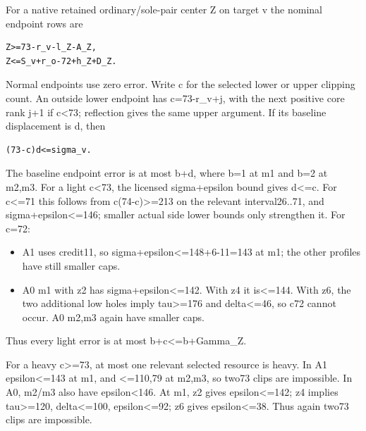 \documentclass[10pt,a4paper]{article}
\theoremstyle{definition}
\providecommand{\tightlist}{\setlength{\itemsep}{0pt}\setlength{\parskip}{0pt}}
\begin{document}
For a native retained ordinary/sole-pair center Z on target v the
nominal endpoint rows are

\begin{lstlisting}
Z>=73-r_v-l_Z-A_Z,
Z<=S_v+r_o-72+h_Z+D_Z.
\end{lstlisting}

Normal endpoints use zero error. Write c for the selected lower or upper
clipping count. An outside lower endpoint has c=\allowbreak{}73-r\_\allowbreak{}v+\allowbreak{}j,\allowbreak{} with the next
positive core rank j+\allowbreak{}1 if c\textless73; reflection gives the same upper
argument. If its baseline displacement is d,\allowbreak{} then

\begin{lstlisting}
(73-c)d<=sigma_v.
\end{lstlisting}

The baseline endpoint error is at most b+\allowbreak{}d,\allowbreak{} where b=\allowbreak{}1 at m1 and b=\allowbreak{}2 at
m2,\allowbreak{}m3. For a light c\textless73,\allowbreak{} the licensed sigma+\allowbreak{}epsilon bound gives
d\textless=\allowbreak{}c. For c\textless=\allowbreak{}71 this follows from
c(74-c)\textgreater=\allowbreak{}213 on the relevant interval26..71,\allowbreak{} and
sigma+\allowbreak{}epsilon\textless=\allowbreak{}146; smaller actual side lower bounds only
strengthen it. For c=\allowbreak{}72:

\begin{itemize}
\tightlist
\item
  A1 uses credit11,\allowbreak{} so sigma+\allowbreak{}epsilon\textless=\allowbreak{}148+\allowbreak{}6-11=\allowbreak{}143 at m1; the
  other profiles have still smaller caps.
\item
  A0 m1 with z2 has sigma+\allowbreak{}epsilon\textless=\allowbreak{}142. With z4 it
  is\textless=\allowbreak{}144. With z6,\allowbreak{} the two additional low holes imply
  tau\textgreater=\allowbreak{}176 and delta\textless=\allowbreak{}46,\allowbreak{} so c72 cannot occur. A0
  m2,\allowbreak{}m3 again have smaller caps.
\end{itemize}

Thus every light error is at most b+\allowbreak{}c\textless=\allowbreak{}b+\allowbreak{}Gamma\_\allowbreak{}Z.

For a heavy c\textgreater=\allowbreak{}73,\allowbreak{} at most one relevant selected resource is
heavy. In A1 epsilon\textless=\allowbreak{}143 at m1,\allowbreak{} and \textless=\allowbreak{}110,\allowbreak{}79 at m2,\allowbreak{}m3,\allowbreak{}
so two73 clips are impossible. In A0,\allowbreak{} m2/m3 also have
epsilon\textless146. At m1,\allowbreak{} z2 gives epsilon\textless=\allowbreak{}142; z4 implies
tau\textgreater=\allowbreak{}120,\allowbreak{} delta\textless=\allowbreak{}100,\allowbreak{} epsilon\textless=\allowbreak{}92; z6 gives
epsilon\textless=\allowbreak{}38. Thus again two73 clips are impossible.
\end{document}
